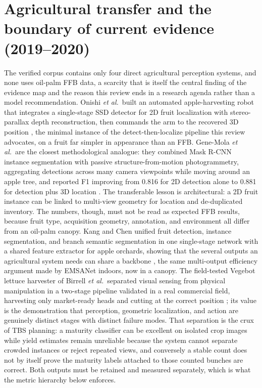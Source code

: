 \section{Agricultural transfer and the boundary of current evidence (2019--2020)}

The verified corpus contains only four direct agricultural perception systems, and none uses oil-palm FFB data, a scarcity that is itself the central finding of the evidence map and the reason this review ends in a research agenda rather than a model recommendation. Onishi \textit{et al.}\ built an automated apple-harvesting robot that integrates a single-stage SSD detector for 2D fruit localization with stereo-parallax depth reconstruction, then commands the arm to the recovered 3D position \cite{onishi2019harvest}, the minimal instance of the detect-then-localize pipeline this review advocates, on a fruit far simpler in appearance than an FFB. Gene-Mola \textit{et al.}\ are the closest methodological analogue: they combined Mask R-CNN instance segmentation with passive structure-from-motion photogrammetry, aggregating detections across many camera viewpoints while moving around an apple tree, and reported F1 improving from 0.816 for 2D detection alone to 0.881 for detection plus 3D location \cite{genemola2020fruit3d}. The transferable lesson is architectural: a 2D fruit instance can be linked to multi-view geometry for location and de-duplicated inventory. The numbers, though, must not be read as expected FFB results, because fruit type, acquisition geometry, annotation, and environment all differ from an oil-palm canopy. Kang and Chen unified fruit detection, instance segmentation, and branch semantic segmentation in one single-stage network with a shared feature extractor for apple orchards, showing that the several outputs an agricultural system needs can share a backbone \cite{kang2020strawberry}, the same multi-output efficiency argument made by EMSANet indoors, now in a canopy. The field-tested Vegebot lettuce harvester of Birrell \textit{et al.}\ separated visual sensing from physical manipulation in a two-stage pipeline validated in a real commercial field, harvesting only market-ready heads and cutting at the correct position \cite{birrell2020lettuce}; its value is the demonstration that perception, geometric localization, and action are genuinely distinct stages with distinct failure modes. That separation is the crux of TBS planning: a maturity classifier can be excellent on isolated crop images while yield estimates remain unreliable because the system cannot separate crowded instances or reject repeated views, and conversely a stable count does not by itself prove the maturity labels attached to those counted bunches are correct. Both outputs must be retained and measured separately, which is what the metric hierarchy below enforces.

